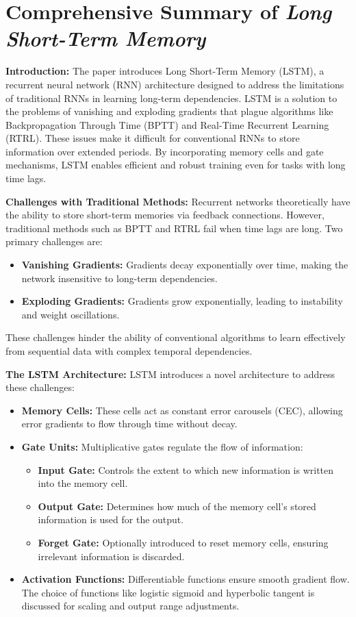 \documentclass{article}
\begin{document}
\section*{Comprehensive Summary of \textit{Long Short-Term Memory}}

\textbf{Introduction:} The paper introduces Long Short-Term Memory (LSTM), a recurrent neural network (RNN) architecture designed to address the limitations of traditional RNNs in learning long-term dependencies. LSTM is a solution to the problems of vanishing and exploding gradients that plague algorithms like Backpropagation Through Time (BPTT) and Real-Time Recurrent Learning (RTRL). These issues make it difficult for conventional RNNs to store information over extended periods. By incorporating memory cells and gate mechanisms, LSTM enables efficient and robust training even for tasks with long time lags.

\textbf{Challenges with Traditional Methods:} Recurrent networks theoretically have the ability to store short-term memories via feedback connections. However, traditional methods such as BPTT and RTRL fail when time lags are long. Two primary challenges are:
\begin{itemize}
    \item \textbf{Vanishing Gradients:} Gradients decay exponentially over time, making the network insensitive to long-term dependencies.
    \item \textbf{Exploding Gradients:} Gradients grow exponentially, leading to instability and weight oscillations.
\end{itemize}
These challenges hinder the ability of conventional algorithms to learn effectively from sequential data with complex temporal dependencies.

\textbf{The LSTM Architecture:} LSTM introduces a novel architecture to address these challenges:
\begin{itemize}
    \item \textbf{Memory Cells:} These cells act as constant error carousels (CEC), allowing error gradients to flow through time without decay.
    \item \textbf{Gate Units:} Multiplicative gates regulate the flow of information:
    \begin{itemize}
        \item \textbf{Input Gate:} Controls the extent to which new information is written into the memory cell.
        \item \textbf{Output Gate:} Determines how much of the memory cell's stored information is used for the output.
        \item \textbf{Forget Gate:} Optionally introduced to reset memory cells, ensuring irrelevant information is discarded.
    \end{itemize}
    \item \textbf{Activation Functions:} Differentiable functions ensure smooth gradient flow. The choice of functions like logistic sigmoid and hyperbolic tangent is discussed for scaling and output range adjustments.
\end{itemize}
\end{document}
